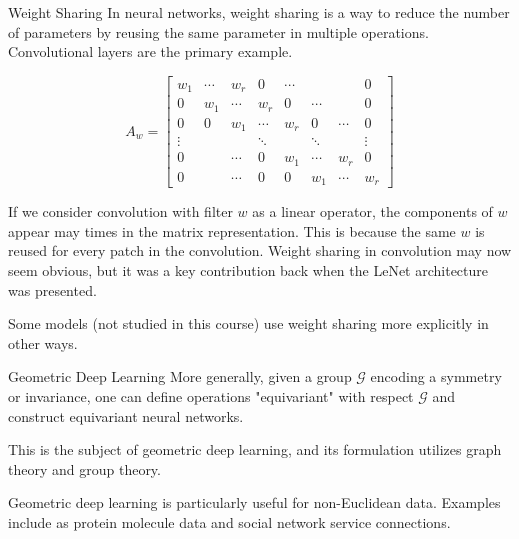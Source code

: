 \begin{frame}[allowframebreaks]

\begin{myconceptblock}{5.9}{Weight Sharing}
    In neural networks, weight sharing is a way to reduce the number of parameters by reusing the same parameter in multiple operations. Convolutional layers are the primary example.

    $$
    A_{w}=\left[\begin{array}{cccccccc}
    w_{1} & \cdots & w_{r} & 0 & \cdots & & & 0 \\
    0 & w_{1} & \cdots & w_{r} & 0 & \cdots & & 0 \\
    0 & 0 & w_{1} & \cdots & w_{r} & 0 & \cdots & 0 \\
    \vdots & & & \ddots & & \ddots & & \vdots \\
    0 & & \cdots & 0 & w_{1} & \cdots & w_{r} & 0 \\
    0 & & \cdots & 0 & 0 & w_{1} & \cdots & w_{r}
    \end{array}\right]
    $$

    If we consider convolution with filter $w$ as a linear operator, the components of $w$ appear may times in the matrix representation.
    This is because the same $w$ is reused for every patch in the convolution.
    Weight sharing in convolution may now seem obvious, but it was a key contribution back when the LeNet architecture was presented.

    Some models (not studied in this course) use weight sharing more explicitly in other ways.
\end{myconceptblock}

\end{frame}

\begin{frame}[allowframebreaks]

\begin{myconceptblock}{5.10}{Geometric Deep Learning}
    More generally, given a group $\mathcal{G}$ encoding a symmetry or invariance, one can define operations "equivariant" with respect $\mathcal{G}$ and construct equivariant neural networks.

    This is the subject of geometric deep learning, and its formulation utilizes graph theory and group theory.

    Geometric deep learning is particularly useful for non-Euclidean data. Examples include as protein molecule data and social network service connections.
\end{myconceptblock}

\end{frame}
